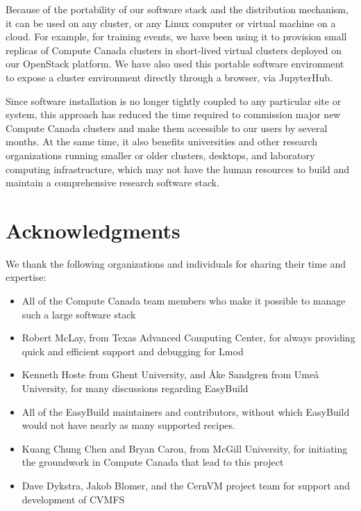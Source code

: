 \documentclass[sigconf]{acmart}
\begin{document}
Because of the portability of our software stack and the distribution mechanism, it can be used on any cluster, or any Linux computer or virtual machine on a cloud. For example, for training events, we have been using it to provision small replicas of Compute Canada clusters in short-lived virtual clusters deployed on our OpenStack platform. We have also used this portable software environment to expose a cluster environment directly through a browser, via JupyterHub. 

Since software installation is no longer tightly coupled to any particular site or system, this approach has reduced the time required to commission major new Compute Canada clusters and make them accessible to our users by several months. At the same time, it also benefits universities and other research organizations running smaller or older clusters, desktops, and laboratory computing infrastructure, which may not have the human resources to build and maintain a comprehensive research software stack.


\section{Acknowledgments}
\label{sec:Acknowledgments}
We thank the following organizations and individuals for sharing their time and expertise:
\begin{itemize}
	\item All of the Compute Canada team members who make it possible to manage such a large software stack
	\item Robert McLay, from Texas Advanced Computing Center, for always providing quick and efficient support and
debugging for Lmod
	\item Kenneth Hoste from Ghent University, and Åke Sandgren from Umeå University, for many discussions
regarding EasyBuild
    \item All of the EasyBuild maintainers and contributors, without which EasyBuild would not have nearly as many supported recipes.
	\item Kuang Chung Chen and Bryan Caron, from McGill University, for initiating the groundwork in Compute Canada that lead to this project
	\item Dave Dykstra, Jakob Blomer, and the CernVM project team for support and development of CVMFS
\end{itemize}



\end{document}

